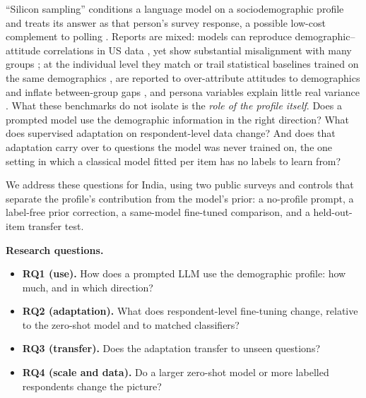 \documentclass[conference]{IEEEtran}
\begin{document}
``Silicon sampling'' conditions a language model on a sociodemographic profile and treats its answer as that person's survey response, a possible low-cost complement to polling \cite{argyle2023}. Reports are mixed: models can reproduce demographic--attitude correlations in US data \cite{argyle2023}, yet show substantial misalignment with many groups \cite{santurkar2023}; at the individual level they match or trail statistical baselines trained on the same demographics \cite{chen2026,miranda2025}, are reported to over-attribute attitudes to demographics and inflate between-group gaps \cite{chen2026}, and persona variables explain little real variance \cite{hu2024}. What these benchmarks do not isolate is the \emph{role of the profile itself}. Does a prompted model use the demographic information in the right direction? What does supervised adaptation on respondent-level data change? And does that adaptation carry over to questions the model was never trained on, the one setting in which a classical model fitted per item has no labels to learn from?

We address these questions for India, using two public surveys and controls that separate the profile's contribution from the model's prior: a no-profile prompt, a label-free prior correction, a same-model fine-tuned comparison, and a held-out-item transfer test.

\textbf{Research questions.}
\begin{itemize}
    \item \textbf{RQ1 (use).} How does a prompted LLM use the demographic profile: how much, and in which direction?
    \item \textbf{RQ2 (adaptation).} What does respondent-level fine-tuning change, relative to the zero-shot model and to matched classifiers?
    \item \textbf{RQ3 (transfer).} Does the adaptation transfer to unseen questions?
    \item \textbf{RQ4 (scale and data).} Do a larger zero-shot model or more labelled respondents change the picture?
\end{itemize}
\end{document}
